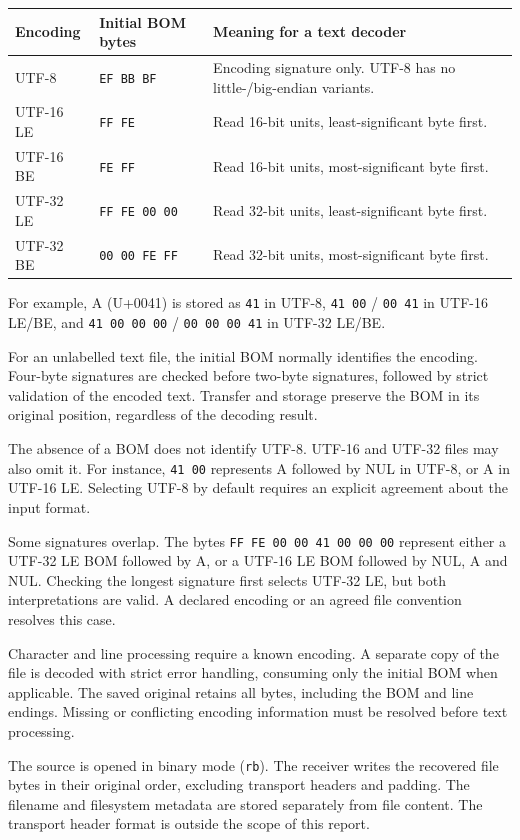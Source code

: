 \documentclass[10pt,a4paper]{article}
\newcommand{\code}[1]{\texttt{#1}}
\newcommand{\topic}[1]{\vspace{5pt}{\large\bfseries #1}\par}
\begin{document}
\begin{tabularx}{\linewidth}{@{}P{23mm}P{33mm}Y@{}}
\toprule
\textbf{Encoding} & \textbf{Initial BOM bytes} & \textbf{Meaning for a text decoder}\\
\midrule
UTF-8 & \code{EF BB BF} & Encoding signature only. UTF-8 has no little-/big-endian variants.\\
UTF-16 LE & \code{FF FE} & Read 16-bit units, least-significant byte first.\\
UTF-16 BE & \code{FE FF} & Read 16-bit units, most-significant byte first.\\
UTF-32 LE & \code{FF FE 00 00} & Read 32-bit units, least-significant byte first.\\
UTF-32 BE & \code{00 00 FE FF} & Read 32-bit units, most-significant byte first.\\
\bottomrule
\end{tabularx}

For example, A (U+0041) is stored as \code{41} in UTF-8, \code{41 00} / \code{00 41} in UTF-16 LE/BE, and \code{41 00 00 00} / \code{00 00 00 41} in UTF-32 LE/BE.

\topic{3. Encoding identification}
For an unlabelled text file, the initial BOM normally identifies the encoding. Four-byte signatures are checked before two-byte signatures, followed by strict validation of the encoded text. Transfer and storage preserve the BOM in its original position, regardless of the decoding result.

The absence of a BOM does not identify UTF-8. UTF-16 and UTF-32 files may also omit it. For instance, \code{41 00} represents A followed by NUL in UTF-8, or A in UTF-16 LE. Selecting UTF-8 by default requires an explicit agreement about the input format.

Some signatures overlap. The bytes \code{FF FE 00 00 41 00 00 00} represent either a UTF-32 LE BOM followed by A, or a UTF-16 LE BOM followed by NUL, A and NUL. Checking the longest signature first selects UTF-32 LE, but both interpretations are valid. A declared encoding or an agreed file convention resolves this case.

Character and line processing require a known encoding. A separate copy of the file is decoded with strict error handling, consuming only the initial BOM when applicable. The saved original retains all bytes, including the BOM and line endings. Missing or conflicting encoding information must be resolved before text processing.

\clearpage
\topic{4. File input and output}
The source is opened in binary mode (\code{rb}). The receiver writes the recovered file bytes in their original order, excluding transport headers and padding. The filename and filesystem metadata are stored separately from file content. The transport header format is outside the scope of this report.
\end{document}
